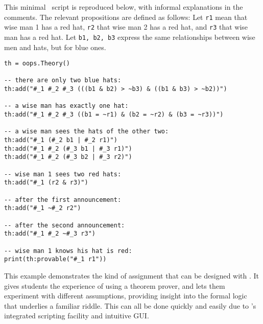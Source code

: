 This minimal  \oops\  script is reproduced below, with informal explanations in the comments. The relevant propositions are defined as follows: Let {\tt r1} mean that wise man 1 has a red hat, {\tt r2} that wise man 2 has a red hat, and {\tt r3} that wise man has a red hat.  Let {\tt b1, b2, b3} express the same relationships between wise men and hats, but for blue ones.

\begin{lstlisting}
th = oops.Theory()

-- there are only two blue hats:
th:add("#_1 #_2 #_3 (((b1 & b2) > ~b3) & ((b1 & b3) > ~b2))")

-- a wise man has exactly one hat:
th:add("#_1 #_2 #_3 ((b1 = ~r1) & (b2 = ~r2) & (b3 = ~r3))")

-- a wise man sees the hats of the other two:
th:add("#_1 (#_2 b1 | #_2 r1)")
th:add("#_1 #_2 (#_3 b1 | #_3 r1)")
th:add("#_1 #_2 (#_3 b2 | #_3 r2)")

-- wise man 1 sees two red hats:
th:add("#_1 (r2 & r3)")

-- after the first announcement:
th:add("#_1 ~#_2 r2")

-- after the second announcement:
th:add("#_1 #_2 ~#_3 r3")

-- wise man 1 knows his hat is red:
print(th:provable("#_1 r1"))

\end{lstlisting}

This example demonstrates the kind of assignment that can be designed with  \oops\/. It gives students the experience of using a theorem prover, and lets them experiment with different assumptions, providing insight into the formal logic that underlies a familiar riddle. This can all be done quickly and easily due to \oops's integrated scripting facility and intuitive GUI.